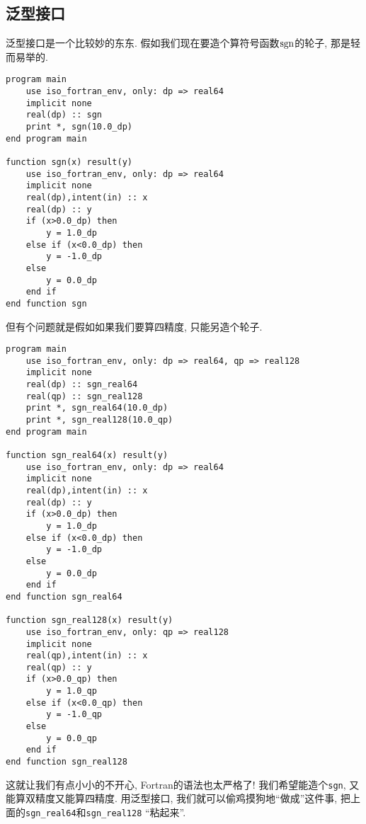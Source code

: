 \subsection{泛型接口}

泛型接口是一个比较妙的东东. 假如我们现在要造个算符号函数$\operatorname{sgn}$的轮子, 那是轻而易举的.
\begin{verbatim}
program main
    use iso_fortran_env, only: dp => real64
    implicit none
    real(dp) :: sgn
    print *, sgn(10.0_dp)
end program main

function sgn(x) result(y)
    use iso_fortran_env, only: dp => real64
    implicit none
    real(dp),intent(in) :: x
    real(dp) :: y
    if (x>0.0_dp) then
        y = 1.0_dp
    else if (x<0.0_dp) then
        y = -1.0_dp
    else
        y = 0.0_dp
    end if
end function sgn
\end{verbatim}
但有个问题就是假如如果我们要算四精度, 只能另造个轮子.
\begin{verbatim}
program main
    use iso_fortran_env, only: dp => real64, qp => real128
    implicit none
    real(dp) :: sgn_real64
    real(qp) :: sgn_real128
    print *, sgn_real64(10.0_dp)
    print *, sgn_real128(10.0_qp)
end program main

function sgn_real64(x) result(y)
    use iso_fortran_env, only: dp => real64
    implicit none
    real(dp),intent(in) :: x
    real(dp) :: y
    if (x>0.0_dp) then
        y = 1.0_dp
    else if (x<0.0_dp) then
        y = -1.0_dp
    else
        y = 0.0_dp
    end if
end function sgn_real64

function sgn_real128(x) result(y)
    use iso_fortran_env, only: qp => real128
    implicit none
    real(qp),intent(in) :: x
    real(qp) :: y
    if (x>0.0_qp) then
        y = 1.0_qp
    else if (x<0.0_qp) then
        y = -1.0_qp
    else
        y = 0.0_qp
    end if
end function sgn_real128
\end{verbatim}
这就让我们有点小小的不开心, Fortran的语法也太严格了! 我们希望能造个\verb|sgn|, 又能算双精度又能算四精度. 用泛型接口, 我们就可以偷鸡摸狗地``做成''这件事, 把上面的\verb|sgn_real64|和\verb|sgn_real128| ``粘起来''.

